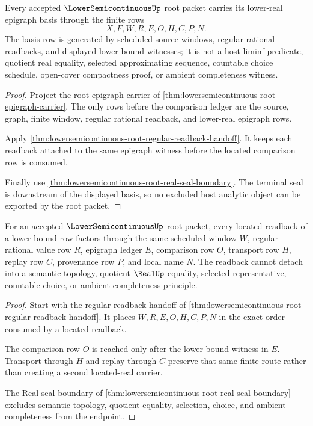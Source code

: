 \begin{theorem}
\label{thm:lowersemicontinuous-root-epigraph-basis}
Every accepted $\LowerSemicontinuousUp$ root packet carries its lower-real epigraph basis through the finite rows
$$
X,F,W,R,E,O,H,C,P,N .
$$
The basis row is generated by scheduled source windows, regular rational readbacks, and displayed lower-bound witnesses; it is not a host liminf predicate, quotient real equality, selected approximating sequence, countable choice schedule, open-cover compactness proof, or ambient completeness witness.
\end{theorem}
\begin{proof}
Project the root epigraph carrier of \autoref{thm:lowersemicontinuous-root-epigraph-carrier}. The only rows before the comparison ledger are the source, graph, finite window, regular rational readback, and lower-real epigraph rows.

Apply \autoref{thm:lowersemicontinuous-root-regular-readback-handoff}. It keeps each readback attached to the same epigraph witness before the located comparison row is consumed.

Finally use \autoref{thm:lowersemicontinuous-root-real-seal-boundary}. The terminal seal is downstream of the displayed basis, so no excluded host analytic object can be exported by the root packet.
\end{proof}

\begin{theorem}
\label{thm:lowersemicontinuous-root-located-readback}
For an accepted $\LowerSemicontinuousUp$ root packet, every located readback of a lower-bound row factors through the same scheduled window $W$, regular rational value row $R$, epigraph ledger $E$, comparison row $O$, transport row $H$, replay row $C$, provenance row $P$, and local name $N$. The readback cannot detach into a semantic topology, quotient $\RealUp$ equality, selected representative, countable choice, or ambient completeness principle.
\end{theorem}
\begin{proof}
Start with the regular readback handoff of \autoref{thm:lowersemicontinuous-root-regular-readback-handoff}. It places $W,R,E,O,H,C,P,N$ in the exact order consumed by a located readback.

The comparison row $O$ is reached only after the lower-bound witness in $E$. Transport through $H$ and replay through $C$ preserve that same finite route rather than creating a second located-real carrier.

The Real seal boundary of \autoref{thm:lowersemicontinuous-root-real-seal-boundary} excludes semantic topology, quotient equality, selection, choice, and ambient completeness from the endpoint.
\end{proof}

